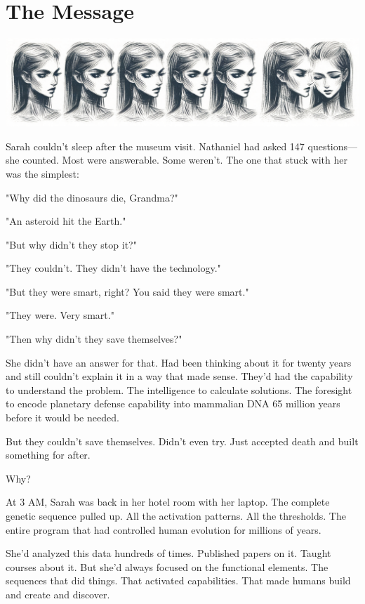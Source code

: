 \chapter{The Message}
\label{ch:31}



\begin{center}
\includegraphics[width=\textwidth]{images/chapterImages/genesis_sketch_00132_.png}
\end{center}

Sarah couldn't sleep after the museum visit. Nathaniel had asked 147 questions—she counted. Most were answerable. Some weren't. The one that stuck with her was the simplest:

"Why did the dinosaurs die, Grandma?"

"An asteroid hit the Earth."

"But why didn't they stop it?"

"They couldn't. They didn't have the technology."

"But they were smart, right? You said they were smart."

"They were. Very smart."

"Then why didn't they save themselves?"

She didn't have an answer for that. Had been thinking about it for twenty years and still couldn't explain it in a way that made sense. They'd had the capability to understand the problem. The intelligence to calculate solutions. The foresight to encode planetary defense capability into mammalian DNA 65 million years before it would be needed.

But they couldn't save themselves. Didn't even try. Just accepted death and built something for after.

Why?

At 3 AM, Sarah was back in her hotel room with her laptop. The complete genetic sequence pulled up. All the activation patterns. All the thresholds. The entire program that had controlled human evolution for millions of years.

She'd analyzed this data hundreds of times. Published papers on it. Taught courses about it. But she'd always focused on the functional elements. The sequences that did things. That activated capabilities. That made humans build and create and discover.

